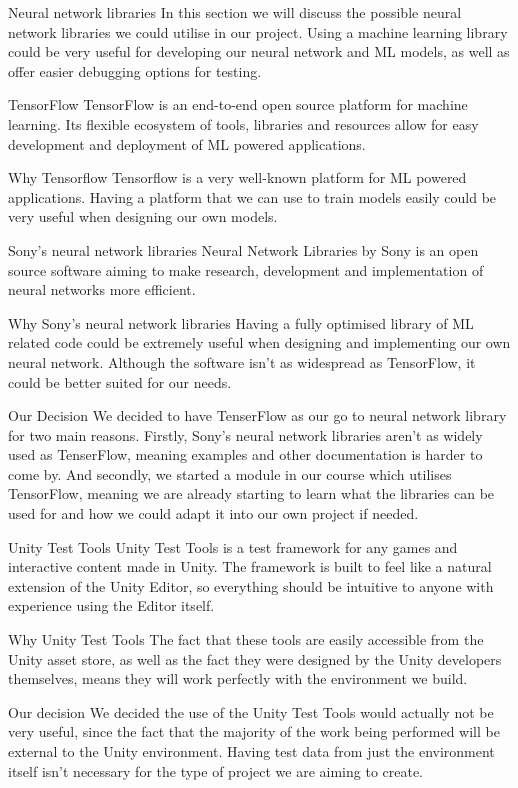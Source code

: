 Neural network libraries
In this section we will discuss the possible neural network libraries we could utilise in our project. Using a machine learning library could be very useful for developing our neural network and ML models, as well as offer easier debugging options for testing.

TensorFlow
TensorFlow is an end-to-end open source platform for machine learning. Its flexible ecosystem of tools, libraries and resources allow for easy development and deployment of ML powered applications.

Why Tensorflow
Tensorflow is a very well-known platform for ML powered applications. Having a platform that we can use to train models easily could be very useful when designing our own models.

Sony’s neural network libraries
Neural Network Libraries by Sony is an open source software aiming to make research, development and implementation of neural networks more efficient.

Why Sony’s neural network libraries
Having a fully optimised library of ML related code could be extremely useful when designing and implementing our own neural network. Although the software isn’t as widespread as TensorFlow, it could be better suited for our needs.

Our Decision
We decided to have TenserFlow as our go to neural network library for two main reasons. Firstly, Sony’s neural network libraries aren’t as widely used as TenserFlow, meaning examples and other documentation is harder to come by. And secondly, we started a module in our course which utilises TensorFlow, meaning we are already starting to learn what the libraries can be used for and how we could adapt it into our own project if needed.

Unity Test Tools 
Unity Test Tools is a test framework for any games and interactive content made in Unity. The framework is built to feel like a natural extension of the Unity Editor, so everything should be intuitive to anyone with experience using the Editor itself.


Why Unity Test Tools
The fact that these tools are easily accessible from the Unity asset store, as well as the fact they were designed by the Unity developers themselves, means they will work perfectly with the environment we build.

Our decision
We decided the use of the Unity Test Tools would actually not be very useful, since the fact that the majority of the work being performed will be external to the Unity environment. Having test data from just the environment itself isn’t necessary for the type of project we are aiming to create.
